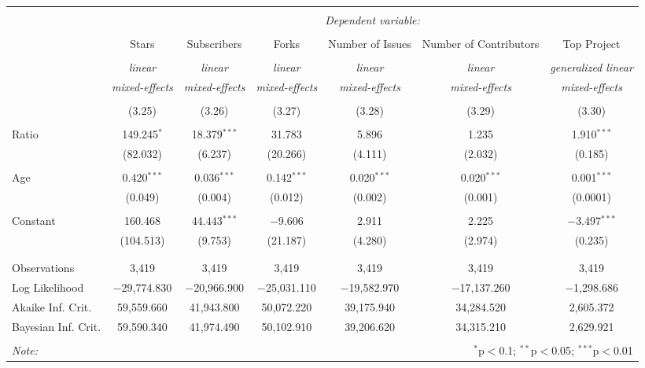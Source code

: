 
\begin{tabular}{@{\extracolsep{5pt}}lcccccc}
\\[-1.8ex]\hline
\hline \\[-1.8ex]
 & \multicolumn{6}{c}{\textit{Dependent variable:}} \\
\cline{2-7}
\\[-1.8ex] & Stars & Subscribers & Forks & Number of Issues & Number of Contributors & Top Project \\
\\[-1.8ex] & \textit{linear} & \textit{linear} & \textit{linear} & \textit{linear} & \textit{linear} & \textit{generalized linear} \\
 & \textit{mixed-effects} & \textit{mixed-effects} & \textit{mixed-effects} & \textit{mixed-effects} & \textit{mixed-effects} & \textit{mixed-effects} \\
\\[-1.8ex] & (3.25) & (3.26) & (3.27) & (3.28) & (3.29) & (3.30)\\
\hline \\[-1.8ex]
 Ratio & 149.245$^{*}$ & 18.379$^{***}$ & 31.783 & 5.896 & 1.235 & 1.910$^{***}$ \\
  & (82.032) & (6.237) & (20.266) & (4.111) & (2.032) & (0.185) \\
  & & & & & & \\
 Age & 0.420$^{***}$ & 0.036$^{***}$ & 0.142$^{***}$ & 0.020$^{***}$ & 0.020$^{***}$ & 0.001$^{***}$ \\
  & (0.049) & (0.004) & (0.012) & (0.002) & (0.001) & (0.0001) \\
  & & & & & & \\
 Constant & 160.468 & 44.443$^{***}$ & $-$9.606 & 2.911 & 2.225 & $-$3.497$^{***}$ \\
  & (104.513) & (9.753) & (21.187) & (4.280) & (2.974) & (0.235) \\
  & & & & & & \\
\hline \\[-1.8ex]
Observations & 3,419 & 3,419 & 3,419 & 3,419 & 3,419 & 3,419 \\
Log Likelihood & $-$29,774.830 & $-$20,966.900 & $-$25,031.110 & $-$19,582.970 & $-$17,137.260 & $-$1,298.686 \\
Akaike Inf. Crit. & 59,559.660 & 41,943.800 & 50,072.220 & 39,175.940 & 34,284.520 & 2,605.372 \\
Bayesian Inf. Crit. & 59,590.340 & 41,974.490 & 50,102.910 & 39,206.620 & 34,315.210 & 2,629.921 \\
\hline
\hline \\[-1.8ex]
\textit{Note:}  & \multicolumn{6}{r}{$^{*}$p$<$0.1; $^{**}$p$<$0.05; $^{***}$p$<$0.01} \\
\end{tabular}
